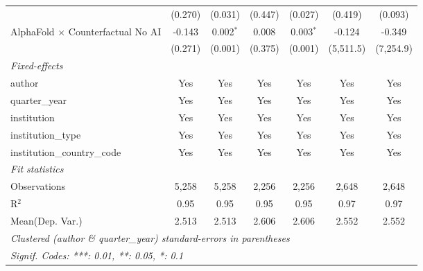 \begin{tabular}{lcccccc}
                                            & (0.270)      & (0.031)        & (0.447) & (0.027)        & (0.419)   & (0.093)\\   
   AlphaFold $\times$ Counterfactual No AI  & -0.143       & 0.002$^{*}$    & 0.008   & 0.003$^{*}$    & -0.124    & -0.349\\   
                                            & (0.271)      & (0.001)        & (0.375) & (0.001)        & (5,511.5) & (7,254.9)\\   
   \midrule
   \emph{Fixed-effects}\\
   author                                   & Yes          & Yes            & Yes     & Yes            & Yes       & Yes\\  
   quarter\_year                            & Yes          & Yes            & Yes     & Yes            & Yes       & Yes\\  
   institution                              & Yes          & Yes            & Yes     & Yes            & Yes       & Yes\\  
   institution\_type                        & Yes          & Yes            & Yes     & Yes            & Yes       & Yes\\  
   institution\_country\_code               & Yes          & Yes            & Yes     & Yes            & Yes       & Yes\\  
   \midrule
   \emph{Fit statistics}\\
   Observations                             & 5,258        & 5,258          & 2,256   & 2,256          & 2,648     & 2,648\\  
   R$^2$                                    & 0.95         & 0.95           & 0.95    & 0.95           & 0.97      & 0.97\\  
Mean(Dep. Var.) & 2.513 & 2.513 & 2.606 & 2.606 & 2.552 & 2.552 \\
   \midrule \midrule
   \multicolumn{7}{l}{\emph{Clustered (author \& quarter\_year) standard-errors in parentheses}}\\
   \multicolumn{7}{l}{\emph{Signif. Codes: ***: 0.01, **: 0.05, *: 0.1}}\\
\end{tabular}
\par\endgroup
